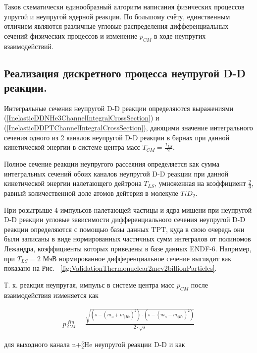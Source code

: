 \documentclass[a4paper,12pt]{article}
\begin{document}
\begin{large}
	Таков схематически единообразный алгоритм написания физических процессов упругой и неупругой ядерной реакции.
	По большому счёту, единственным отличием являются различные угловые распределения дифференциальных сечений физических процессов и изменение $p_{CM}$ в ходе неупругих взаимодействий.
	
\subsection{Реализация дискретного процесса неупругой D-D реакции.}
\label{InelasticDDReactionRealization}

	Интегральные сечения неупругой D-D реакции определяются выражениями (\ref{InelasticDDNHe3ChannelIntegralCrossSection}) и (\ref{InelasticDDPTChannelIntegralCrossSection}), дающими значение интегрального сечения одного из 2 каналов неупругой D-D реакции в барнах при данной кинетической энергии в системе центра масс $T_{CM}=\frac{T_{LS}}{2}$.
	
	Полное сечение реакции неупругого рассеяния определяется как сумма интегральных сечений обоих каналов неупругой D-D реакции при данной кинетической энергии налетающего дейтрона $T_{LS}$, умноженная на коэффициент $\frac{2}{3}$, равный количественной доле атомов дейтерия в молекуле $TiD_2$.
	
	При розыгрыше 4-импульсов налетающей частицы и ядра мишени при неупругой D-D реакции угловые зависимости дифференциального сечения неупругой D-D реакции определяются с помощью базы данных TPT, куда в свою очередь они были записаны в виде нормированных частичных сумм интегралов от полиномов Лежандра, коэффициенты которых приведены в базе данных ENDF-6.
	Например, при $T_{LS}=2$ МэВ нормированное дифференциальное сечение выглядит как показано на Рис. ~\ref{fig:ValidationThermonuclear2mev2billionParticles}.
	
	Т. к. реакция неупругая, импульс в системе центра масс $p_{CM}$ после взаимодействия изменяется как  \cite[стр.~321]{PDG}
	
\begin{equation}
\label{PCMInelasticDDAfterNHe3}
\begin{aligned} 
  p\,_{CM}^{fin} = \frac{ \sqrt{ \left( s-\left( m_n + m_{^3_2He}\right)^2 \right) \cdot \left( s-\left( m_n - m_{^3_2He} \right)^2 \right) } }{2\cdot \sqrt{s}}
\end{aligned}
\end{equation}

	для выходного канала n+$^3_2$He неупругой реакции D-D и как


\end{large}
\end{document}

